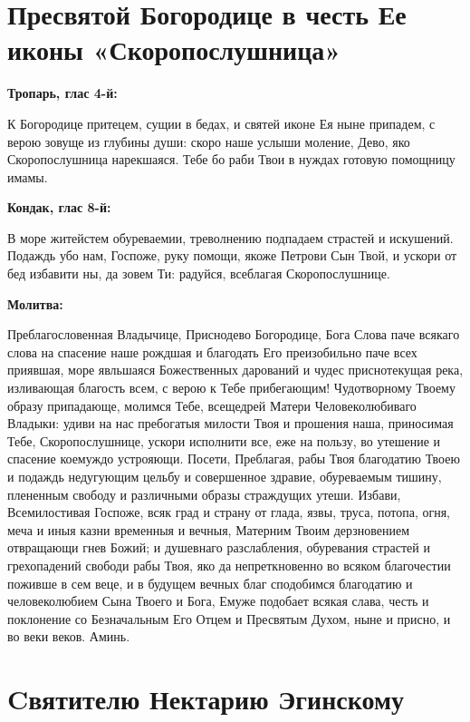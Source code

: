 \section{Пресвятой Богородице в честь Ее иконы «Скоропослушница»}
 


\bfseries Тропарь, глас 4-й:\normalfont{}\nopagebreak


К Богородице притецем, сущии в бедах, и святей иконе Ея ныне припадем, с верою зовуще из глубины души: скоро наше услыши моление, Дево, яко Скоропослушница нарекшаяся. Тебе бо раби Твои в нуждах готовую помощницу имамы.


\medskip


\bfseries Кондак, глас 8-й:\normalfont{}\nopagebreak


В море житейстем обуреваемии, треволнению подпадаем страстей и искушений. Подаждь убо нам, Госпоже, руку помощи, якоже Петрови Сын Твой, и ускори от бед избавити ны, да зовем Ти: радуйся, всеблагая Скоропослушнице.


\medskip


\bfseries Молитва:\normalfont{}\nopagebreak


Преблагословенная Владычице, Приснодево Богородице, Бога Слова паче всякаго слова на спасение наше рождшая и благодать Его преизобильно паче всех приявшая, море явльшаяся Божественных дарований и чудес приснотекущая река, изливающая благость всем, с верою к Тебе прибегающим! Чудотворному Твоему образу припадающе, молимся Тебе, всещедрей Матери Человеколюбиваго Владыки: удиви на нас пребогатыя милости Твоя и прошения наша, приносимая Тебе, Скоропослушнице, ускори исполнити все, еже на пользу, во утешение и спасение коемуждо устрояющи. Посети, Преблагая, рабы Твоя благодатию Твоею и подаждь недугующим цельбу и совершенное здравие, обуреваемым тишину, плененным свободу и различными образы страждущих утеши. Избави, Всемилостивая Госпоже, всяк град и страну от глада, язвы, труса, потопа, огня, меча и иныя казни временныя и вечныя, Матерним Твоим дерзновением отвращающи гнев Божий; и душевнаго разслабления, обуревания страстей и грехопадений свободи рабы Твоя, яко да непреткновенно во всяком благочестии поживше в сем веце, и в будущем вечных благ сподобимся благодатию и человеколюбием Сына Твоего и Бога, Емуже подобает всякая слава, честь и поклонение со Безначальным Его Отцем и Пресвятым Духом, ныне и присно, и во веки веков. Аминь.


\section{Cвятителю Нектарию Эгинскому}
 


